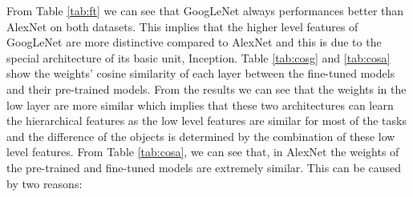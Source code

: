 From Table \ref{tab:ft} we can see that GoogLeNet always performances better than AlexNet on both datasets. This implies that the higher level features of GoogLeNet are more distinctive compared to AlexNet and this is due to the special architecture of its basic unit, Inception. Table \ref{tab:cosg} and \ref{tab:cosa} show the weights' cosine similarity of each layer between the fine-tuned models and their pre-trained models. From the results we can see that the weights in the low layer are more similar which implies that these two architectures can learn the hierarchical features as the low level features are similar for most of the tasks and the difference of the objects is determined by the combination of these low level features. From Table \ref{tab:cosa}, we can see that, in AlexNet the weights of the pre-trained and fine-tuned models are extremely similar. This can be caused by two reasons:
